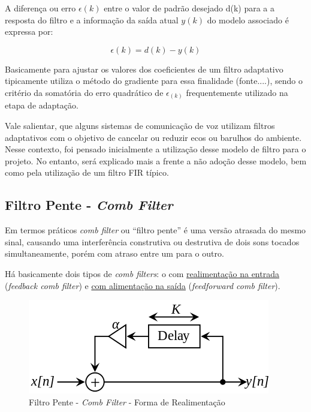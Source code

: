 		A diferença ou erro $\epsilon(k)$ entre o valor de padrão desejado d(k) para a a resposta do filtro e a informação da saída atual $y(k)$ do modelo associado é expressa por:
		
		\begin{equation}
			\label{eq2-filtroadap}
			\epsilon(k) = d(k)- y(k)
		\end{equation}
		
		Basicamente para ajustar os valores dos coeficientes de um filtro adaptativo tipicamente utiliza o método do gradiente para essa finalidade (fonte....), sendo o critério da somatória do erro quadrático de $\epsilon_(k)$ frequentemente utilizado na etapa de adaptação.
		
		Vale salientar, que alguns sistemas de comunicação de voz utilizam filtros adaptativos com o objetivo de cancelar ou reduzir ecos ou barulhos do ambiente. Nesse contexto, foi pensado inicialmente a utilização desse modelo de filtro para o projeto. No entanto, será explicado mais a frente a não adoção desse modelo, bem como pela utilização de um filtro FIR típico.
		
	\subsection{Filtro Pente - \textit{Comb Filter}}
	\label{comb-filter}
		
		Em termos práticos \textit{comb filter} ou “filtro pente” é uma versão atrasada do mesmo sinal, causando uma  interferência construtiva ou destrutiva de dois sons tocados simultaneamente, porém com atraso entre um para o outro.
		
		Há basicamente dois tipos de \textit{comb filters}: o com \underline{realimentação na entrada} (\textit{feedback comb filter}) e \underline{com alimentação na saída} (\textit{feedforward comb filter}).
		
		\begin{figure}[hbt]
			\centering
			\includegraphics[scale=0.5]{./figuras/Comb_filter_feedback.png}
			\caption{Filtro Pente - \textit{Comb Filter} - Forma de Realimentação}
			\label{fig01-combfilter}
		\end{figure}
		
